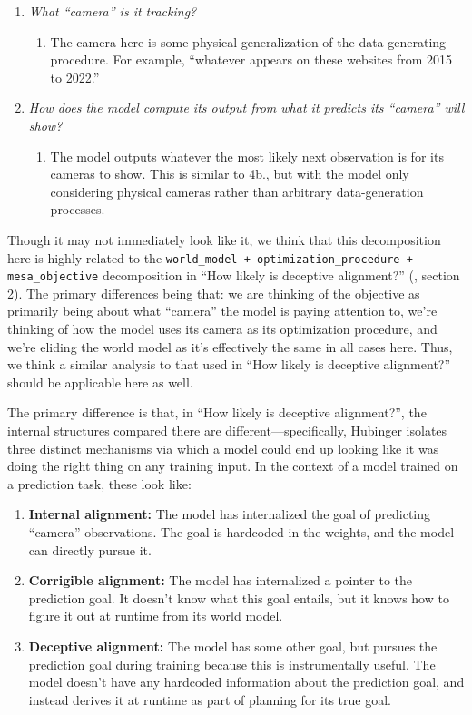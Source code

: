 \documentclass[
  onecolumn,
  nonatbib,
]{miri-tech-article}
\begin{document}
\begin{enumerate}
    \begin{enumerate}
    \item \textit{What ``camera'' is it tracking?}
        \begin{enumerate}
        \item The camera here is some physical generalization of the data-generating procedure. For example, ``whatever appears on these websites from 2015 to 2022.''
        \end{enumerate}
    \item \textit{How does the model compute its output from what it predicts its ``camera'' will show?}
        \begin{enumerate}
        \item The model outputs whatever the most likely next observation is for its cameras to show. This is similar to 4b., but with the model only considering physical cameras rather than arbitrary data-generation processes.
        \end{enumerate}
    \end{enumerate}
\end{enumerate}

Though it may not immediately look like it, we think that this decomposition here is highly related to the \texttt{world\_model + optimization\_procedure + mesa\_objective} decomposition in ``How likely is deceptive alignment?'' (\cite{how_likely_deception}, section 2). The primary differences being that: we are thinking of the objective as primarily being about what ``camera'' the model is paying attention to, we're thinking of how the model uses its camera as its optimization procedure, and we're eliding the world model as it's effectively the same in all cases here. Thus, we think a similar analysis to that used in ``How likely is deceptive alignment?'' should be applicable here as well.

The primary difference is that, in ``How likely is deceptive alignment?'', the internal structures compared there are different---specifically, Hubinger isolates three distinct mechanisms via which a model could end up looking like it was doing the right thing on any training input. In the context of a model trained on a prediction task, these look like:



\begin{enumerate}
\item \textbf{Internal alignment:} The model has internalized the goal of predicting ``camera'' observations. The goal is hardcoded in the weights, and the model can directly pursue it.
\item \textbf{Corrigible alignment:} The model has internalized a pointer to the prediction goal. It doesn't know what this goal entails, but it knows how to figure it out at runtime from its world model.
\item \textbf{Deceptive alignment:} The model has some other goal, but pursues the prediction goal during training because this is instrumentally useful. The model doesn't have any hardcoded information about the prediction goal, and instead derives it at runtime as part of planning for its true goal.
\end{enumerate}
\end{document}

